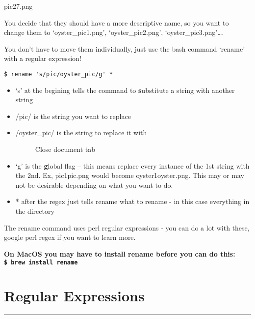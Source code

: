 \documentclass[
  letterpaper,
  DIV=11,
  numbers=noendperiod]{scrreprt}
\begin{document}
pic27.png

You decide that they should have a more descriptive name, so you want to
change them to `oyster\_pic1.png', `oyster\_pic2.png',
`oyster\_pic3.png'\ldots.

You don't have to move them individually, just use the bash command
`rename' with a regular expression!

\begin{verbatim}
$ rename 's/pic/oyster_pic/g' *
\end{verbatim}

\begin{itemize}
\item
  `s' at the begining tells the command to \textbf{s}ubstitute a string
  with another string
\item
  /pic/ is the string you want to replace
\item
  /oyster\_pic/ is the string to replace it with

  \begin{figure}

  {\centering 

  }

  \caption{Close document tab}

  \end{figure}
\item
  `g' is the \textbf{g}lobal flag -- this means replace every instance
  of the 1st string with the 2nd. Ex, pic1pic.png would become
  oyster1oyster.png. This may or may not be desirable depending on what
  you want to do.
\item
  * after the regex just tells rename what to rename - in this case
  everything in the directory
\end{itemize}

The rename command uses perl regular expressions - you can do a lot with
these, google perl regex if you want to learn more.

\textbf{On MacOS you may have to install rename before you can do this:
\texttt{\$\ brew\ install\ rename}}

\hypertarget{regular-expressions}{%
\chapter{Regular Expressions}\label{regular-expressions}}

\begin{center}\rule{0.5\linewidth}{0.5pt}\end{center}
\end{document}
